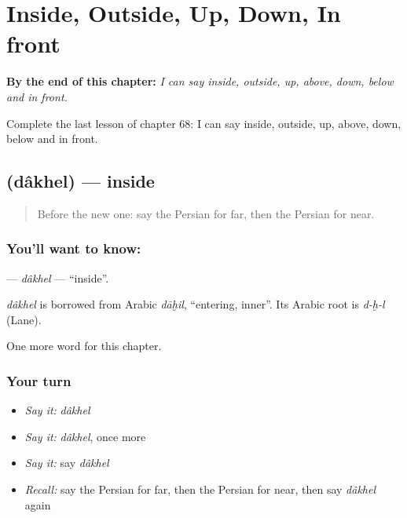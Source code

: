 
\chapter{Inside, Outside, Up, Down, In front}
\label{ch:fa-inside-outside-up-down-in-front}

\begin{chapteropening}
\textbf{By the end of this chapter:} \emph{I can say inside, outside, up, above, down, below and in front.}

Complete the last lesson of chapter 68: I can say inside, outside, up, above, down, below and in front.
\end{chapteropening}

\section[\texorpdfstring{\fa{داخل} (dâkhel)}{داخل (dâkhel)}]{ (dâkhel) — inside}

\label{lesson:FA-C68-dakhel}



\begin{quote}
Before the new one: say the Persian for far, then the Persian for near.
\end{quote}

\subsection*{You'll want to know: }
\textbf{} — \emph{dâkhel} — \textquotedblleft{}inside\textquotedblright{}.

\begin{cousinweb}
\emph{dâkhel} is borrowed from Arabic \emph{dāḫil}, \textquotedblleft{}entering, inner\textquotedblright{}. Its Arabic root is \emph{d-ḫ-l} (Lane).
\end{cousinweb}

\begin{grammarlens}[title={What you've built}]
One more word for this chapter.
\end{grammarlens}

\subsection*{Your turn}
\begin{itemize}
\raggedright
  \item \emph{Say it:} \emph{dâkhel}
  \item \emph{Say it:} \emph{dâkhel}, once more
  \item \emph{Say it:} say \emph{dâkhel}
  \item \emph{Recall:} say the Persian for far, then the Persian for near, then say \emph{dâkhel} again
\end{itemize}

